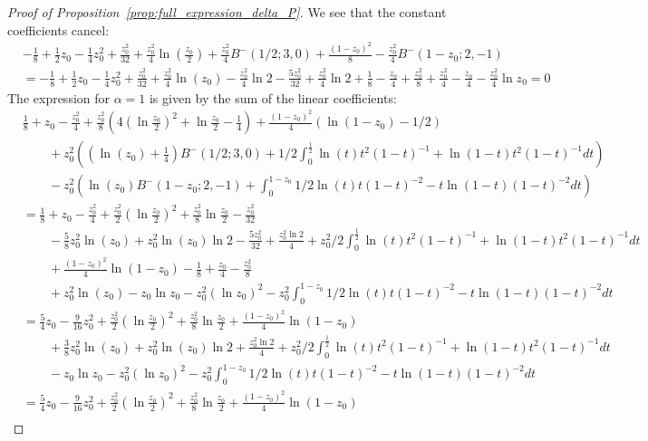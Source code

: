 \begin{proof}[Proof of Proposition~\ref{prop:full_expression_delta_P}]
We see that the constant coefficients cancel:
\begin{align*}
&-\frac{1}{8}+\frac{1}{2}z_0-\frac{1}{4}z_0^2+\frac{z_0^2}{32}+\frac{z_0^2}{4}\ln(\frac{z_0}{2}) +\frac{z_0^2}{4}B^-(1/2;3,0)+\frac{(1-z_0)^2}{8}-\frac{z_0^2}{4}B^-(1-z_0;2,-1) \\
&=-\frac{1}{8}+\frac{1}{2}z_0-\frac{1}{4}z_0^2+\frac{z_0^2}{32}+\frac{z_0^2}{4}\ln(z_0)-\frac{z_0^2}{4}\ln 2 -\frac{5z_0^2}{32}+\frac{z_0^2}{4}\ln2 +\frac{1}{8}-\frac{z_0}{4}+\frac{z_0^2}{8}+\frac{z_0^2}{4}-\frac{z_0}{4}-\frac{z_0^2}{4}\ln z_0 =0
\end{align*}
The expression for $\alpha=1$ is given by the sum of the linear coefficients:
\begin{align*}
&\frac{1}{8}+z_0-\frac{z_0^2}{4}+\frac{z_0^2}{8}(4(\ln\frac{z_0}{2})^2+\ln\frac{z_0}{2} - \frac{1}{4}) +\frac{(1-z_0)^2}{4} (\ln(1-z_0)-1/2 )\\
&\qquad+z_0^2\left(\left(\ln(z_0)+\frac{1}{4}\right) B^-(1/2;3,0)+1/2\int_0^{\frac{1}{2}} \ln(t)t^2(1-t)^{-1}+\ln(1-t)t^2(1-t)^{-1}dt \right) \\
&\qquad- z_0^{2}\left(\ln(z_0)B^-(1-z_0;2,-1)+\int_0^{1-z_0} 1/2\ln(t)t(1-t)^{-2}-t\ln(1-t)(1-t)^{-2}dt \right) \\
&=\frac{1}{8}+z_0-\frac{z_0^2}{4}+\frac{z_0^2}{2}(\ln\frac{z_0}{2})^2+\frac{z_0^2}{8}\ln\frac{z_0}{2} - \frac{z_0^2}{32} \\
&\qquad-\frac{5}{8}z_0^2\ln(z_0)+z_0^2\ln(z_0)\ln 2-\frac{5z_0^2}{32}+\frac{z_0^2 \ln2}{4}+z_0^2/2\int_0^{\frac{1}{2}} \ln(t)t^2(1-t)^{-1}+\ln(1-t)t^2(1-t)^{-1}dt \\
&\qquad+\frac{(1-z_0)^2}{4}\ln(1-z_0) -\frac{1}{8}+\frac{z_0}{4}-\frac{z_0^2}{8}\\
&\qquad+ z_0^2\ln(z_0)-z_0 \ln z_0-z_0^2(\ln z_0)^2-z_0^2\int_0^{1-z_0} 1/2\ln(t)t(1-t)^{-2}-t\ln(1-t)(1-t)^{-2}dt \\
&=\frac{5}{4}z_0-\frac{9}{16}z_0^2 +\frac{z_0^2}{2}(\ln\frac{z_0}{2})^2+\frac{z_0^2}{8}\ln\frac{z_0}{2} +\frac{(1-z_0)^2}{4}\ln(1-z_0) \\
&\qquad+\frac{3}{8}z_0^2\ln(z_0)+z_0^2\ln(z_0)\ln 2+\frac{z_0^2 \ln2}{4}+z_0^2/2\int_0^{\frac{1}{2}} \ln(t)t^2(1-t)^{-1}+\ln(1-t)t^2(1-t)^{-1}dt \\
&\qquad-z_0 \ln z_0-z_0^2(\ln z_0)^2-z_0^2\int_0^{1-z_0} 1/2\ln(t)t(1-t)^{-2}-t\ln(1-t)(1-t)^{-2}dt \\
&=\frac{5}{4}z_0-\frac{9}{16}z_0^2 +\frac{z_0^2}{2}(\ln\frac{z_0}{2})^2+\frac{z_0^2}{8}\ln\frac{z_0}{2} +\frac{(1-z_0)^2}{4}\ln(1-z_0) \\

\end{align*}
\end{proof}

